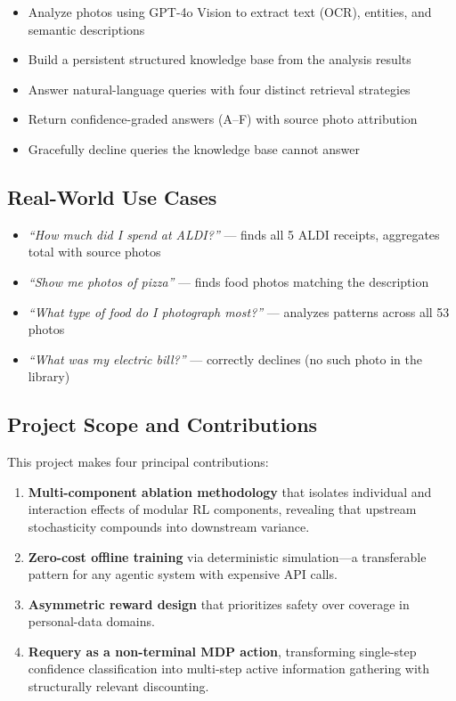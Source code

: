 \documentclass[11pt,letterpaper]{article}
\begin{document}
\begin{itemize}[nosep]
  \item Analyze photos using GPT-4o Vision to extract text (OCR), entities, and semantic descriptions
  \item Build a persistent structured knowledge base from the analysis results
  \item Answer natural-language queries with four distinct retrieval strategies
  \item Return confidence-graded answers (A--F) with source photo attribution
  \item Gracefully decline queries the knowledge base cannot answer
\end{itemize}

\subsection{Real-World Use Cases}

\begin{itemize}[nosep]
  \item \textit{``How much did I spend at ALDI?''} --- finds all 5 ALDI receipts, aggregates total with source photos
  \item \textit{``Show me photos of pizza''} --- finds food photos matching the description
  \item \textit{``What type of food do I photograph most?''} --- analyzes patterns across all 53 photos
  \item \textit{``What was my electric bill?''} --- correctly declines (no such photo in the library)
\end{itemize}

\subsection{Project Scope and Contributions}

This project makes four principal contributions:

\begin{enumerate}[nosep]
  \item \textbf{Multi-component ablation methodology} that isolates individual and interaction effects of modular RL components, revealing that upstream stochasticity compounds into downstream variance.
  \item \textbf{Zero-cost offline training} via deterministic simulation---a transferable pattern for any agentic system with expensive API calls.
  \item \textbf{Asymmetric reward design} that prioritizes safety over coverage in personal-data domains.
  \item \textbf{Requery as a non-terminal MDP action}, transforming single-step confidence classification into multi-step active information gathering with structurally relevant discounting.
\end{enumerate}
\end{document}
